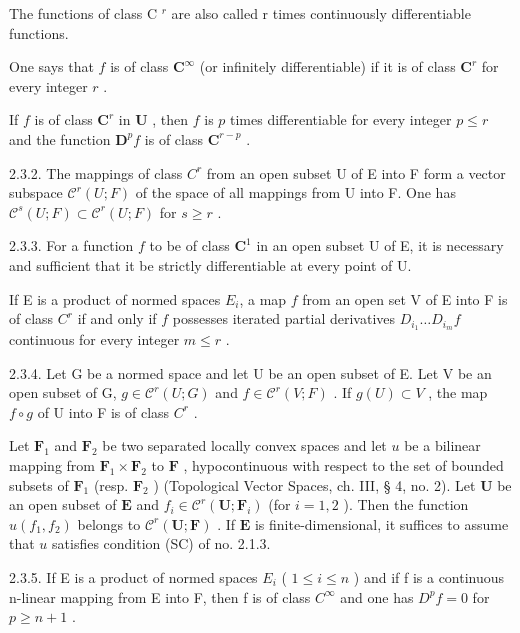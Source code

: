 The functions of class C \(^{r}\) are also called r times continuously differentiable functions.

One says that \(f\) is of class \(\mathbf{C}^{\infty}\) (or infinitely differentiable) if it is of class \(\mathbf{C}^{r}\) for every integer \(r\) .

If \(f\) is of class \(\mathbf{C}^{r}\) in \(\mathbf{U}\) , then \(f\) is \(p\) times differentiable for every integer \(p \leqslant r\) and the function \(\mathbf{D}^{p}f\) is of class \(\mathbf{C}^{r-p}\) .

2.3.2. The mappings of class \(C^{r}\) from an open subset U of E into F form a vector subspace \(\mathcal{C}^{r}(U;F)\) of the space of all mappings from U into F. One has \(\mathcal{C}^{s}(U;F)\subset\mathcal{C}^{r}(U;F)\) for \(s\geqslant r\) .

2.3.3. For a function \(f\) to be of class \(\mathbf{C}^{1}\) in an open subset U of E, it is necessary and sufficient that it be strictly differentiable at every point of U.

If E is a product of normed spaces \(E_{i}\), a map \(f\) from an open set V of E into F is of class \(C^{r}\) if and only if \(f\) possesses iterated partial derivatives \(D_{i_{1}}\ldots D_{i_{m}}f\) continuous for every integer \(m \leqslant r\) .

2.3.4. Let G be a normed space and let U be an open subset of E. Let V be an open subset of G, \(g \in \mathcal{C}^{r}(U; G)\) and \(f \in \mathcal{C}^{r}(V; F)\) . If \(g(U) \subset V\) , the map \(f \circ g\) of U into F is of class \(C^{r}\) .

Let \(\mathbf{F}_1\) and \(\mathbf{F}_2\) be two separated locally convex spaces and let \(u\) be a bilinear mapping from \(\mathbf{F}_1 \times \mathbf{F}_2\) to \(\mathbf{F}\) , hypocontinuous with respect to the set of bounded subsets of \(\mathbf{F}_1\) (resp. \(\mathbf{F}_2\) ) (Topological Vector Spaces, ch. III, § 4, no. 2). Let \(\mathbf{U}\) be an open subset of \(\mathbf{E}\) and \(f_i \in \mathcal{C}^r(\mathbf{U};\mathbf{F}_i)\) (for \(i = 1,2\) ). Then the function \(u(f_1,f_2)\) belongs to \(\mathcal{C}^r(\mathbf{U};\mathbf{F})\) . If \(\mathbf{E}\) is finite-dimensional, it suffices to assume that \(u\) satisfies condition (SC) of no. 2.1.3.

2.3.5. If E is a product of normed spaces \(E_{i}\) ( \(1 \leqslant i \leqslant n\) ) and if f is a continuous n-linear mapping from E into F, then f is of class \(C^{\infty}\) and one has \(D^{p}f = 0\) for \(p \geqslant n + 1\) .

